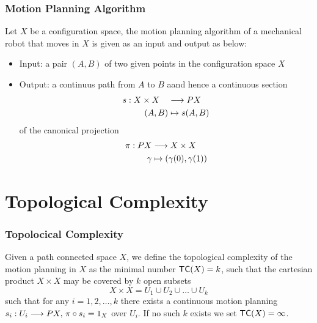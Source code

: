 \documentclass{beamer}
\begin{document}
\begin{frame}
    \frametitle{Motion Planning Algorithm}
    \begin{defn}
        Let $X$ be a configuration space, the motion planning algorithm of a mechanical robot that moves in $X$ is given as an input and output as below:
        \begin{itemize}
            \item Input: a pair $(A,B)$ of two given points in the configuration space $X$
            \item Output: a continuus path from $A$ to $B$ aand hence a continuous section
                  \begin{align*}
                      s: X \times X \quad & \longrightarrow PX        \\
                      (A,B)               & \mapsto s(A,B)
                  \end{align*}
                  of the canonical projection
                  \begin{align*}
                      \pi: PX & \longrightarrow X \times X               \\
                      \gamma  & \mapsto (\gamma(0),\gamma(1))
                  \end{align*}
        \end{itemize}
    \end{defn}
\end{frame}

\section{Topological Complexity}

\begin{frame}
    \frametitle{Topolocical Complexity}
    \begin{defn}
        Given a path connected space $X$, we define the topological complexity of the motion planning in $X$ as the minimal number $\textsf{TC}(X) = k$, such that the cartesian product $X \times X$ may be covered by $k$ open subsets
        \[
            X \times X  = U_1 \cup U_2 \cup \dots \cup U_k
        \]
        such that for any $i = 1,2, \ldots, k$ there exists a continuous motion planning $s_i: U_i \longrightarrow PX, \, \pi \circ s_i = 1_X$ over $U_i$. If no such $k$ exists we set $\textsf{TC}(X) = \infty$.
    \end{defn}
\end{frame}
\end{document}
